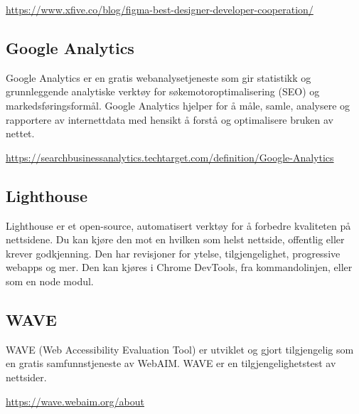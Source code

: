 \url{https://www.xfive.co/blog/figma-best-designer-developer-cooperation/}

\subsection{ Google Analytics}
Google Analytics er en gratis webanalysetjeneste som gir statistikk og grunnleggende analytiske verktøy for søkemotoroptimalisering (SEO) og markedsføringsformål. Google Analytics hjelper for å måle, samle, analysere og rapportere av internettdata med hensikt å forstå og optimalisere bruken av nettet.

\url{https://searchbusinessanalytics.techtarget.com/definition/Google-Analytics}

\subsection{Lighthouse}
Lighthouse er et open-source, automatisert verktøy for å forbedre kvaliteten på nettsidene. Du kan kjøre den mot en hvilken som helst nettside, offentlig eller krever godkjenning. Den har revisjoner for ytelse, tilgjengelighet, progressive webapps og mer. Den kan kjøres i Chrome DevTools, fra kommandolinjen, eller som en node modul.

\subsection{WAVE}
WAVE (Web Accessibility Evaluation Tool) er utviklet og gjort tilgjengelig som en gratis samfunnstjeneste av WebAIM. WAVE er en tilgjengelighetstest av nettsider.

\url{https://wave.webaim.org/about}
\clearpage